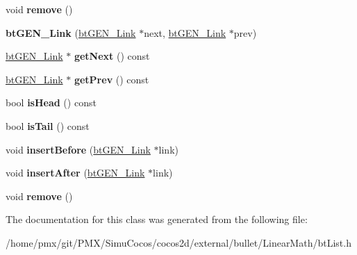 \begin{DoxyCompactItemize}
void {\bfseries remove} ()
\item 
\mbox{\label{classbtGEN__Link_afaba3db8d7d56d142b31d55cc5a10bc4}} 
{\bfseries bt\+G\+E\+N\+\_\+\+Link} (\hyperlink{classbtGEN__Link}{bt\+G\+E\+N\+\_\+\+Link} $\ast$next, \hyperlink{classbtGEN__Link}{bt\+G\+E\+N\+\_\+\+Link} $\ast$prev)
\item 
\mbox{\label{classbtGEN__Link_a970ce1adca46812aa82447277293758b}} 
\hyperlink{classbtGEN__Link}{bt\+G\+E\+N\+\_\+\+Link} $\ast$ {\bfseries get\+Next} () const
\item 
\mbox{\label{classbtGEN__Link_a59e43cf9051cfb5a382080cbc91e0a0f}} 
\hyperlink{classbtGEN__Link}{bt\+G\+E\+N\+\_\+\+Link} $\ast$ {\bfseries get\+Prev} () const
\item 
\mbox{\label{classbtGEN__Link_a2379f363e64d96fa9dfb0e2c81c17f47}} 
bool {\bfseries is\+Head} () const
\item 
\mbox{\label{classbtGEN__Link_a342b96a01677249c377eb74d4381c583}} 
bool {\bfseries is\+Tail} () const
\item 
\mbox{\label{classbtGEN__Link_af9a44671d7450b325ad0805b01eed382}} 
void {\bfseries insert\+Before} (\hyperlink{classbtGEN__Link}{bt\+G\+E\+N\+\_\+\+Link} $\ast$link)
\item 
\mbox{\label{classbtGEN__Link_a5cd8cbf3991ce5c33771ce3abcc54cd5}} 
void {\bfseries insert\+After} (\hyperlink{classbtGEN__Link}{bt\+G\+E\+N\+\_\+\+Link} $\ast$link)
\item 
\mbox{\label{classbtGEN__Link_ac2fcb105c73b7e9473d2cdca22d26c7b}} 
void {\bfseries remove} ()
\end{DoxyCompactItemize}


The documentation for this class was generated from the following file\+:\begin{DoxyCompactItemize}
\item 
/home/pmx/git/\+P\+M\+X/\+Simu\+Cocos/cocos2d/external/bullet/\+Linear\+Math/bt\+List.\+h\end{DoxyCompactItemize}
